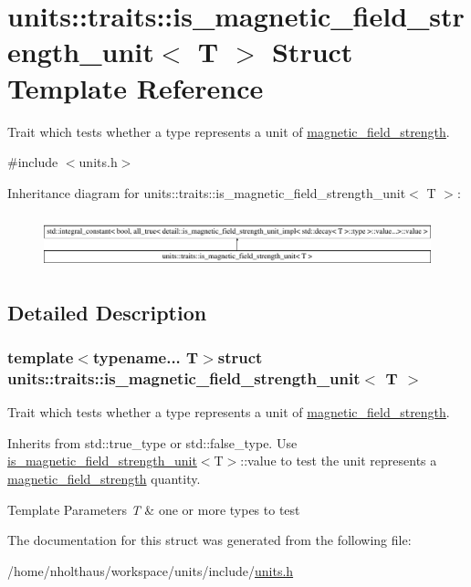 \hypertarget{structunits_1_1traits_1_1is__magnetic__field__strength__unit}{}\section{units\+:\+:traits\+:\+:is\+\_\+magnetic\+\_\+field\+\_\+strength\+\_\+unit$<$ T $>$ Struct Template Reference}
\label{structunits_1_1traits_1_1is__magnetic__field__strength__unit}


Trait which tests whether a type represents a unit of \hyperlink{namespaceunits_1_1magnetic__field__strength}{magnetic\+\_\+field\+\_\+strength}.  




{\ttfamily \#include $<$units.\+h$>$}

Inheritance diagram for units\+:\+:traits\+:\+:is\+\_\+magnetic\+\_\+field\+\_\+strength\+\_\+unit$<$ T $>$\+:\begin{figure}[H]
\begin{center}
\leavevmode
\includegraphics[height=1.544828cm]{structunits_1_1traits_1_1is__magnetic__field__strength__unit}
\end{center}
\end{figure}


\subsection{Detailed Description}
\subsubsection*{template$<$typename... T$>$struct units\+::traits\+::is\+\_\+magnetic\+\_\+field\+\_\+strength\+\_\+unit$<$ T $>$}

Trait which tests whether a type represents a unit of \hyperlink{namespaceunits_1_1magnetic__field__strength}{magnetic\+\_\+field\+\_\+strength}. 

Inherits from {\ttfamily std\+::true\+\_\+type} or {\ttfamily std\+::false\+\_\+type}. Use {\ttfamily \hyperlink{structunits_1_1traits_1_1is__magnetic__field__strength__unit}{is\+\_\+magnetic\+\_\+field\+\_\+strength\+\_\+unit}$<$T$>$\+::value} to test the unit represents a \hyperlink{namespaceunits_1_1magnetic__field__strength}{magnetic\+\_\+field\+\_\+strength} quantity. 
\begin{DoxyTemplParams}{Template Parameters}
{\em T} & one or more types to test \\
\hline
\end{DoxyTemplParams}


The documentation for this struct was generated from the following file\+:\begin{DoxyCompactItemize}
\item 
/home/nholthaus/workspace/units/include/\hyperlink{units_8h}{units.\+h}\end{DoxyCompactItemize}
